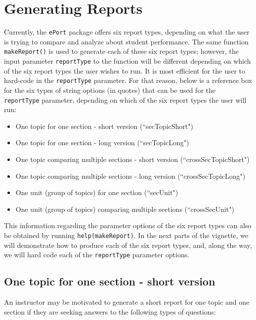 \documentclass{article}\usepackage[]{graphicx}\usepackage[]{color}
\numberwithin{equation}{section} %
\newcommand{\pkg}[1]{{\texttt{#1}}}
\begin{document}
\section{Generating Reports}

Currently, the \pkg{ePort} package offers six report types, depending on what the user is trying to compare and analyze about student performance. The same function \texttt{makeReport()} is used to generate each of these six report types; however, the input parameter \texttt{reportType} to the function will be different depending on which of the six report types the user wishes to run. It is most efficient for the user to hard-code in the \texttt{reportType} parameter. For that reason, below is a reference box for the six types of string options (in quotes) that can be used for the \texttt{reportType} parameter, depending on which of the six report types the user will run: 
\begin{framed}
\begin{itemize}
\vspace{-3mm}
\item One topic for one section - short version (``secTopicShort")
\item One topic for one section - long version (``secTopicLong")
\item One topic comparing multiple sections - short version (``crossSecTopicShort")
\item One topic comparing multiple sections - long version (``crossSecTopicLong")
\item One unit (group of topics) for one section (``secUnit")
\item One unit (group of topics) comparing multiple sections (``crossSecUnit")
\end{itemize}
\end{framed}

This information regarding the parameter options of the six report types can also be obtained by running \texttt{help(makeReport)}. In the next parts of the vignette, we will demonstrate how to produce each of the six report types, and, along the way, we will hard code each of the \texttt{reportType} parameter options.

\subsection{One topic for one section - short version}
\label{sec:oneTopicSectionShort}

An instructor may be motivated to generate a short report for one topic and one section if they are seeking answers to the following types of questions:
\end{document}
